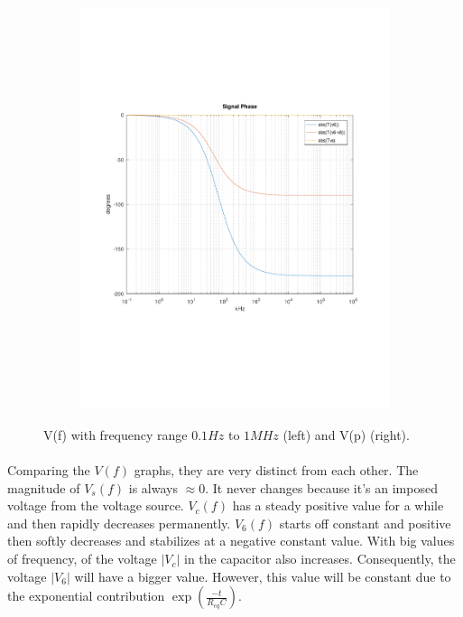 \begin{figure}[h]
\begin{subfigure}{0.23\textwidth}
    \includegraphics[width=\linewidth, clip]{../mat/Transphase.pdf}
    \label{fig:PSciclo}
  \end{subfigure}

  \caption{\small V(f) with frequency range $0.1Hz$ to $1MHz$ (left) and V(p) (right).}
  \label{maquina}
\end{figure}

\paragraph{} Comparing the $V(f)$ graphs,
they are very distinct from each other.
The magnitude of $V_s(f)$ is always $\approx 0$. It never changes because it's
an imposed voltage from the voltage source. $V_c(f)$ has a steady positive value for a while
and then rapidly decreases permanently. $V_6(f)$ starts off constant and positive then softly decreases
and stabilizes at a negative constant value. With big values of frequency, of the voltage $|V_c|$ in the capacitor also increases.
Consequently, the voltage $|V_6|$ will have a bigger value. However, this value will be constant due to the exponential contribution $ \exp(\frac{-t}{R_{eq}C})$.


